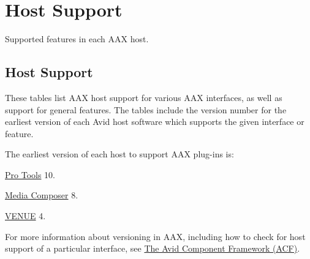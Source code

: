 \hypertarget{a00373}{}\section{Host Support}
\label{a00373}
Supported features in each A\+A\+X host. 

 \hypertarget{a00373_hostsupport}{}\subsection{Host Support}\label{a00373_hostsupport}
 These tables list A\+A\+X host support for various A\+A\+X interfaces, as well as support for general features. The tables include the version number for the earliest version of each Avid host software which supports the given interface or feature.

The earliest version of each host to support A\+A\+X plug-\/ins is\+: \begin{DoxyItemize}
\item \hyperlink{a00360}{Pro Tools} 10. \item \hyperlink{a00361}{Media Composer} 8. \item \hyperlink{a00377}{V\+E\+N\+U\+E} 4.\end{DoxyItemize}
For more information about versioning in A\+A\+X, including how to check for host support of a particular interface, see \hyperlink{a00357}{The Avid Component Framework (A\+C\+F)}.

